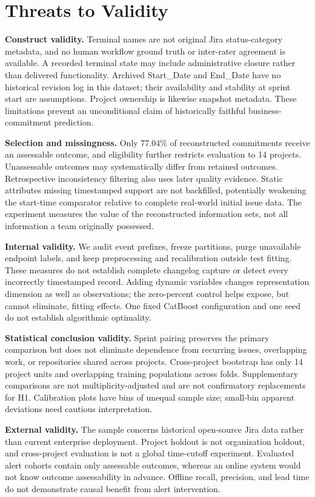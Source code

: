\section{Threats to Validity}\label{threats-to-validity}

\textbf{Construct validity.} Terminal names are not original Jira status-category metadata, and no human workflow ground truth or inter-rater agreement is available. A recorded terminal state may include administrative closure rather than delivered functionality. Archived Start\_Date and End\_Date have no historical revision log in this dataset; their availability and stability at sprint start are assumptions. Project ownership is likewise snapshot metadata. These limitations prevent an unconditional claim of historically faithful business-commitment prediction.

\textbf{Selection and missingness.} Only 77.04\% of reconstructed commitments receive an assessable outcome, and eligibility further restricts evaluation to 14 projects. Unassessable outcomes may systematically differ from retained outcomes. Retrospective inconsistency filtering also uses later quality evidence. Static attributes missing timestamped support are not backfilled, potentially weakening the start-time comparator relative to complete real-world initial issue data. The experiment measures the value of the reconstructed information sets, not all information a team originally possessed.

\textbf{Internal validity.} We audit event prefixes, freeze partitions, purge unavailable endpoint labels, and keep preprocessing and recalibration outside test fitting. These measures do not establish complete changelog capture or detect every incorrectly timestamped record. Adding dynamic variables changes representation dimension as well as observations; the zero-percent control helps expose, but cannot eliminate, fitting effects. One fixed CatBoost configuration and one seed do not establish algorithmic optimality.

\textbf{Statistical conclusion validity.} Sprint pairing preserves the primary comparison but does not eliminate dependence from recurring issues, overlapping work, or repositories shared across projects. Cross-project bootstrap has only 14 project units and overlapping training populations across folds. Supplementary comparisons are not multiplicity-adjusted and are not confirmatory replacements for H1. Calibration plots have bins of unequal sample size; small-bin apparent deviations need cautious interpretation.

\textbf{External validity.} The sample concerns historical open-source Jira data rather than current enterprise deployment. Project holdout is not organization holdout, and cross-project evaluation is not a global time-cutoff experiment. Evaluated alert cohorts contain only assessable outcomes, whereas an online system would not know outcome assessability in advance. Offline recall, precision, and lead time do not demonstrate causal benefit from alert intervention.
